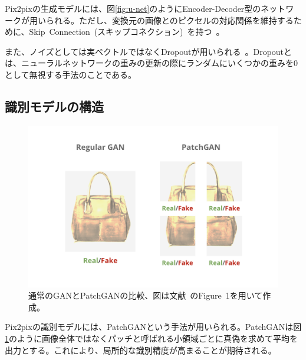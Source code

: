 Pix2pixの生成モデルには、図\ref{fig:u-net}のようにEncoder-Decoder型のネットワークが用いられる。ただし、変換元の画像とのピクセルの対応関係を維持するために、Skip~Connection~(スキップコネクション)~を持つ~\cite{u-net}。

また、ノイズとしては実ベクトルではなくDropoutが用いられる~\cite{Dropout}。Dropoutとは、ニューラルネットワークの重みの更新の際にランダムにいくつかの重みを0として無視する手法のことである。

\subsection{識別モデルの構造}

\begin{figure}[t]
\begin{center}
\includegraphics[width=\hsize]{figure/patchgan.png}
\caption{通常のGANとPatchGANの比較、図は文献~\cite{pix2pix}のFigure~1を用いて作成。}
\label{fig:patchgan}
\end{center}
\end{figure}

Pix2pixの識別モデルには、PatchGANという手法が用いられる。PatchGANは図\ref{fig:patchgan}のように画像全体ではなくパッチと呼ばれる小領域ごとに真偽を求めて平均を出力とする。これにより、局所的な識別精度が高まることが期待される。